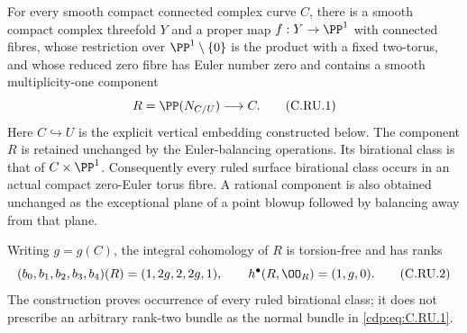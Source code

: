
\begin{proposition}\label{cdp:st:C.2.UN.45}
For every smooth compact connected complex curve $C$, there is a smooth
compact complex threefold $Y$ and a proper map $f:Y\to\PP^1$ with connected
fibres, whose restriction over $\PP^1\setminus\{0\}$ is the product with a
fixed two-torus, and whose reduced zero fibre has Euler number zero and
contains a smooth multiplicity-one component
\[
                         R=\PP(N_{C/U})\longrightarrow C.
\tag{C.RU.1}\label{cdp:eq:C.RU.1}
\]
Here $C\hookrightarrow U$ is the explicit vertical embedding constructed
below. The component $R$ is retained unchanged by the Euler-balancing
operations. Its birational class is that of $C\times\PP^1$.
Consequently every ruled surface birational class occurs in an actual
compact zero-Euler torus fibre. A rational component is also obtained
unchanged as the exceptional plane of a point blowup followed by balancing
away from that plane.

Writing $g=g(C)$, the integral cohomology of $R$ is torsion-free and has ranks
\[
              (b_0,b_1,b_2,b_3,b_4)(R)=(1,2g,2,2g,1),
              \qquad h^\bullet(R,\OO_R)=(1,g,0).
\tag{C.RU.2}\label{cdp:eq:C.RU.2}
\]
The construction proves occurrence of every ruled birational class; it
does not prescribe an arbitrary rank-two bundle as the normal bundle in
\eqref{cdp:eq:C.RU.1}.
\end{proposition}

